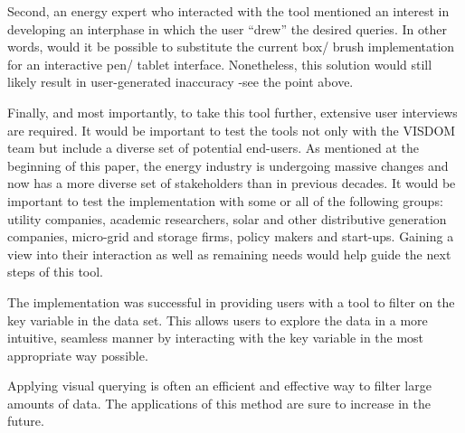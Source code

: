\documentclass[letterpaper, 12 pt, conference]{ieeeconf}  %
\begin{document}
Second, an energy expert who interacted with the tool mentioned an interest in developing an interphase in which the user “drew” the desired queries. In other words, would it be possible to substitute the current box/ brush implementation for an interactive pen/ tablet interface. Nonetheless, this solution would still likely result in user-generated inaccuracy -see the point above.


Finally, and most importantly, to take this tool further, extensive user interviews are required. It would be important to test the tools not only with the VISDOM team but include a diverse set of potential end-users. As mentioned at the beginning of this paper, the energy industry is undergoing massive changes and now has a more diverse set of stakeholders than in previous decades. It would be important to test the implementation with some or all of the following groups: utility companies, academic researchers, solar and other distributive generation companies, micro-grid and storage firms, policy makers and start-ups. Gaining a view into their interaction as well as remaining needs would help guide the next steps of this tool.








The implementation was successful in providing users with a tool to filter on the key variable in the data set. This allows users to explore the data in a more intuitive, seamless manner by interacting with the key variable in the most appropriate way possible.


Applying visual querying is often an efficient and effective way to filter large amounts of data. The applications of this method are sure to increase in the future.


 

\end{document}
